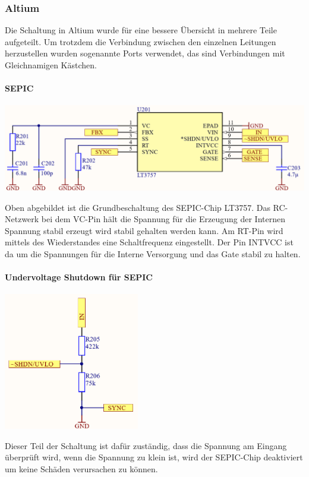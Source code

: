 \documentclass[paper=a4, 12pt]{scrreprt}
\begin{document}
			\subsubsection{Altium}
			Die Schaltung in Altium wurde für eine bessere Übersicht in mehrere Teile aufgeteilt. Um trotzdem die Verbindung zwischen den einzelnen Leitungen herzustellen wurden sogenannte Ports verwendet, das sind Verbindungen mit Gleichnamigen Kästchen.
			\paragraph{SEPIC}
			\begin{adjustbox}{center,caption={Grundbeschaltung des LT3757},label={fig:LT3757-Grundbeschaltung},nofloat=figure,vspace=\bigskipamount}
				\includegraphics[width=\textwidth]{img/SEPIC_Altium.PNG}
			\end{adjustbox}
			Oben abgebildet ist die Grundbeschaltung des SEPIC-Chip LT3757. Das RC-Netzwerk bei dem VC-Pin hält die Spannung für die Erzeugung der Internen Spannung stabil erzeugt wird stabil gehalten werden kann. Am RT-Pin wird mittels des Wiederstandes eine Schaltfrequenz eingestellt. Der Pin INTVCC ist da um die Spannungen für die Interne Versorgung und das Gate stabil zu halten.
			\paragraph{Undervoltage Shutdown für SEPIC}
			\begin{adjustbox}{center,caption={Undervoltage Shutdown Schaltung für LT3757},label={fig:uvlo},nofloat=figure,vspace=\bigskipamount}
				\includegraphics[height=6cm]{img/Undervolteage_Shutdown_SEPIC.PNG}
			\end{adjustbox}
			Dieser Teil der Schaltung ist dafür zuständig, dass die Spannung am Eingang überprüft wird, wenn die Spannung zu klein ist, wird der SEPIC-Chip deaktiviert um keine Schäden verursachen zu können.
			\pagebreak
\end{document}
